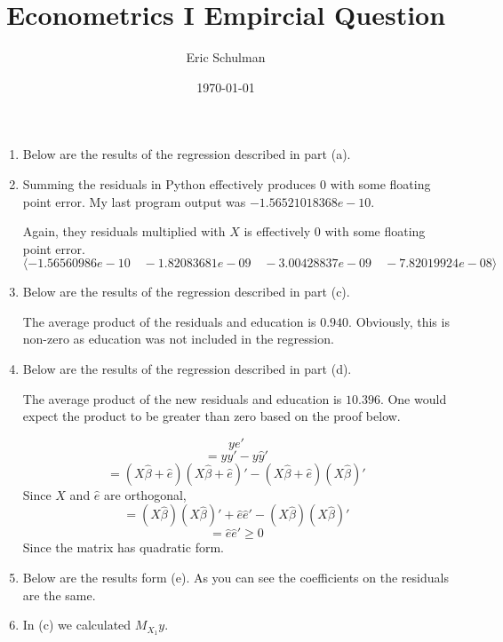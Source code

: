\documentclass{article}
\title{Econometrics I Empircial Question}
\author{Eric Schulman}
\date{\today}
\begin{document}
\maketitle

\begin{enumerate}[label=\alph*)]

\item Below are the results of the regression described in part (a).



\item Summing the residuals in Python effectively produces 0 with some floating point error. My last program output was $-1.56521018368e-10.
$

Again, they residuals multiplied with $X$ is effectively $0$ with some floating point error. $\langle -1.56560986e-10 \quad -1.82083681e-09 \quad -3.00428837e-09 \quad -7.82019924e-08 \rangle$

\item 

Below are the results of the regression described in part (c).



The average product of the residuals and education is $0.940$. Obviously, this is non-zero as education was not included in the regression.


\item

Below are the results of the regression described in part (d).



The average product of the new residuals and education is $10.396$. One would expect the product to be greater than zero based on the proof below.


$$ye'$$
$$= yy' - y\hat{y}'$$
$$= (X\hat{\beta} + \hat{e})(X\hat{\beta} + \hat{e})' - (X\hat{\beta} + \hat{e})(X\hat{\beta})' $$
Since $X$ and $\hat{e}$ are orthogonal,
$$= (X\hat{\beta})(X\hat{\beta})' + \hat{e} \hat{e}' - (X\hat{\beta})(X\hat{\beta})' $$
$$ = \hat{e}\hat{e}' \geq 0$$
Since the matrix has quadratic form.

\item

Below are the results form (e). As you can see the coefficients on the residuals are the same.



\item

In (c) we calculated $M_{X_1}y$. 


\end{enumerate}
\end{document}
